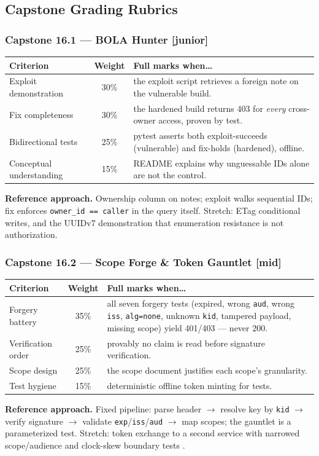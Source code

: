 \subsection{Capstone Grading Rubrics}

\subsubsection*{Capstone 16.1 --- BOLA Hunter [junior]}
\begin{center}\small
\begin{tabularx}{\textwidth}{l c X}
\toprule
\textbf{Criterion} & \textbf{Weight} & \textbf{Full marks when\ldots} \\
\midrule
Exploit demonstration & 30\% & the exploit script retrieves a foreign note on the vulnerable build. \\
Fix completeness & 30\% & the hardened build returns 403 for \emph{every} cross-owner access, proven by test. \\
Bidirectional tests & 25\% & pytest asserts both exploit-succeeds (vulnerable) and fix-holds (hardened), offline. \\
Conceptual understanding & 15\% & README explains why unguessable IDs alone are not the control. \\
\bottomrule
\end{tabularx}
\end{center}
\textbf{Reference approach.} Ownership column on notes; exploit walks
sequential IDs; fix enforces \texttt{owner\_id == caller} in the query
itself. Stretch: ETag conditional writes, and the UUIDv7 demonstration that
enumeration resistance is not authorization.

\subsubsection*{Capstone 16.2 --- Scope Forge \& Token Gauntlet [mid]}
\begin{center}\small
\begin{tabularx}{\textwidth}{l c X}
\toprule
\textbf{Criterion} & \textbf{Weight} & \textbf{Full marks when\ldots} \\
\midrule
Forgery battery & 35\% & all seven forgery tests (expired, wrong \texttt{aud}, wrong \texttt{iss}, \texttt{alg=none}, unknown \texttt{kid}, tampered payload, missing scope) yield 401/403 --- never 200. \\
Verification order & 25\% & provably no claim is read before signature verification. \\
Scope design & 25\% & the scope document justifies each scope's granularity. \\
Test hygiene & 15\% & deterministic offline token minting for tests. \\
\bottomrule
\end{tabularx}
\end{center}
\textbf{Reference approach.} Fixed pipeline: parse header $\to$ resolve key
by \texttt{kid} $\to$ verify signature $\to$ validate
\texttt{exp}/\texttt{iss}/\texttt{aud} $\to$ map scopes; the gauntlet is a
parameterized test. Stretch: token exchange to a second service with
narrowed scope/audience and clock-skew boundary tests \cite{rfc7519}.

